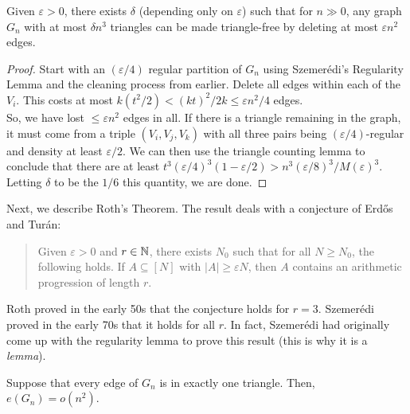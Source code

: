			\begin{ftheo}
				\label{theo: triangle removal lemma}
				Given $\varepsilon>0$, there exists $\delta$ (depending only on $\varepsilon$) such that for $n\gg 0$, any graph $G_n$ with at most $\delta n^3$ triangles can be made triangle-free by deleting at most $\varepsilon n^2$ edges.
			\end{ftheo}
			\begin{proof}
				Start with an $(\varepsilon/4)$ regular partition of $G_n$ using Szemer\'{e}di's Regularity Lemma and the cleaning process from earlier. Delete all edges within each of the $V_i$. This costs at most $k (t^2/2) < (kt)^2/2k \le \varepsilon n^2/4$ edges.\\
				So, we have lost $\le \varepsilon n^2$ edges in all. If there is a triangle remaining in the graph, it must come from a triple $(V_i,V_j,V_k)$ with all three pairs being $(\varepsilon/4)$-regular and density at least $\varepsilon/2$. We can then use the triangle counting lemma to conclude that there are at least $t^3 (\varepsilon/4)^3 (1 - \varepsilon/2) > n^3 (\varepsilon/8)^3 / M(\varepsilon)^3$. Letting $\delta$ to be the $1/6$ this quantity, we are done.
			\end{proof}

			Next, we describe Roth's Theorem. The result deals with a conjecture of Erd\H{o}s and Tur\'{a}n:
			\begin{quote}
				Given $\varepsilon > 0$ and $r\in\mathbb{N}$, there exists $N_0$ such that for all $N \ge N_0$, the following holds. If $A \subseteq [N]$ with $|A| \ge \varepsilon N$, then $A$ contains an arithmetic progression of length $r$. 
			\end{quote}

			Roth proved in the early 50s that the conjecture holds for $r=3$. Szemer\'{e}di proved in the early 70s that it holds for all $r$. In fact, Szemer\'{e}di had originally come up with the regularity lemma to prove this result (this is why it is a \emph{lemma}).

			\begin{lemma}
				\label{lemma: roth's theorem edge in unique triangle}
				Suppose that every edge of $G_n$ is in exactly one triangle. Then, $e(G_n) = o(n^2)$.
			\end{lemma}

